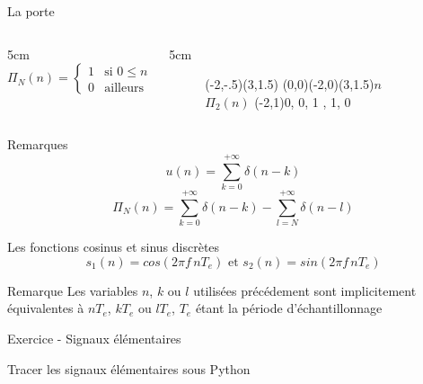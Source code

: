 \documentclass{beamer}
\newcounter{exampleBlockCounter}
\begin{document}
\begin{frame}
\begin{block}{La porte}
\begin{columns}[t]
	\begin{column}{5cm}
	\smallbreak 
		\[
		\Pi_{N}(n)=
		\begin{cases}
		1 & \text{si } 0 \leq n \leq N-1 \\
		0 & \text{ailleurs}
		\end{cases}
		\]
	\end{column}
	\begin{column}{5cm}
		\begin{figure}
			\begin{pspicture}[showgrid=false](-2,-.5)(3,1.5)
				\psaxeslabels{->}(0,0)(-2,0)(3,1.5){$n$}{$\Pi_{2}(n)$}
				\psstem[stemhead=o, stemtag](-2,1){0, 0, 1 , 1, 0}  
			\end{pspicture}
		\end{figure}
	\end{column}
\end{columns}
\end{block}
\pause
\begin{alertblock}{Remarques}
\[
u(n) = \sum_{k=0}^{+\infty} \delta (n-k)
\] 
\[
\Pi_{N}(n) = \sum_{k=0}^{+\infty} \delta (n-k) - \sum_{l=N}^{+\infty}
\delta(n-l)
\] 
\end{alertblock} 
\end{frame}

\begin{frame}
\begin{block}{Les fonctions cosinus et sinus discrètes}
	\[
		s_1(n) = cos(2\pi f \,  nT_e)\text{ et }s_2(n) = sin(2\pi f \, nT_e)
	\]
\end{block}

\begin{alertblock}{Remarque}
\justifying
Les variables $n$, $k$ ou $l$ utilisées précédement sont implicitement
équivalentes à $nT_e$, $kT_e$ ou $lT_e$, $T_e$ étant la période d'échantillonnage 
\end{alertblock} 
\pause
\begin{exampleblock}{Exercice  - Signaux élémentaires}\justifying 
\itemize
	\item Tracer les signaux élémentaires sous Python %
\end{exampleblock}
\end{frame}  
\end{document}

